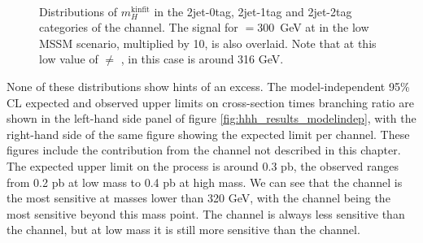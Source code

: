 \begin{figure}[h!]
\begin{center}
~\\
\end{center}
\caption{Distributions of $m_{H}^{\text{kinfit}}$ in the 2jet-0tag, 2jet-1tag and 2jet-2tag categories 
of the \etau channel. The \Htohhtobbtautau signal for \mA $ = 300 $~GeV at  in the low \tanb~ MSSM
scenario, multiplied by 10, is also overlaid. Note that at this low value of \tanb \mA$\neq$ \mH, in 
this case \mH is around 316 GeV.}
\label{fig:hhh_results_mhkinfit_etau}
\end{figure}

None of these distributions show hints of an excess. The model-independent 95\% CL expected and observed upper limits
on cross-section times branching ratio are shown in the left-hand side 
panel of figure \ref{fig:hhh_results_modelindep}, with the right-hand side of the same figure
showing the expected limit per channel. These figures include the contribution from the 
\tautau channel not described in this chapter. The expected upper limit
on the \Htohhtobbtautau process is around 0.3 pb, the observed ranges
from 0.2 pb at low mass to 0.4 pb at high mass. We can
see that the \mutau channel is the most sensitive at masses lower than 320 GeV, with 
the \tautau channel being the most sensitive beyond this mass point. The \etau channel is always
less sensitive than the \mutau channel, but at low mass it is still more sensitive than the \tautau 
channel.

